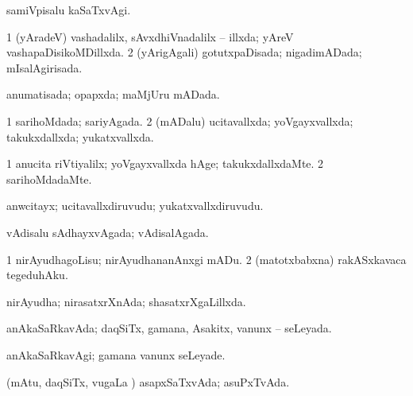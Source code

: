 {\bentry
{} 
\gl{\nA}
\expl{}
\bmng
{} 
\emng
\eentry

\bentry
{} 
\gl{\kirxvi}
\expl{}
\bmng
samiVpisalu kaSaTxvAgi. 
\emng
\eentry

\bentry
{} 
\gl{\gu}
\expl{}
\bmng
\bnum
\num{1} (yAradeV) vashadalilx, sAvxdhiVnadalilx -- illxda; yAreV vashapaDisikoMDillxda. 
\num{2} (yArigAgali) gotutxpaDisada; nigadimADada; mIsalAgirisada. 
\enum
\emng
\eentry

\bentry
{} 
\gl{\gu}
\expl{}
\bmng
anumatisada; opapxda; maMjUru mADada. 
\emng
\eentry

\bentry
{} 
\gl{\gu}
\expl{}
\bmng
\bnum
\num{1} sarihoMdada; sariyAgada. 
\num{2} (mADalu) ucitavallxda; yoVgayxvallxda; takukxdallxda; yukatxvallxda. 
\enum
\emng
\eentry

\bentry
{} 
\gl{\kirxvi}
\bmng
\bnum
\num{1} anucita riVtiyalilx; yoVgayxvallxda hAge; takukxdallxdaMte. 
\num{2} sarihoMdadaMte. 
\enum
\emng
\eentry

\bentry
{} 
\gl{\nA}
\expl{}
\bmng
anwcitayx; ucitavallxdiruvudu; yukatxvallxdiruvudu. 
\emng
\eentry

\bentry
{} 
\gl{\gu}
\expl{}
\bmng
vAdisalu sAdhayxvAgada; vAdisalAgada. 
\emng
\eentry

\bentry
{} 
\gl{\sakirx}
\expl{}
\bmng
\bnum
\num{1} nirAyudhagoLisu; nirAyudhananAnxgi mADu. 
\num{2} (matotxbabxna) rakASxkavaca tegeduhAku. 
\enum
\emng
\eentry

\bentry
{} 
\gl{\gu}
\expl{}
\bmng
nirAyudha; nirasatxrXnAda; shasatxrXgaLillxda. 
\emng
\eentry

\bentry
{} 
\gl{\gu}
\expl{}
\bmng
anAkaSaRkavAda; daqSiTx, gamana, Asakitx, \mo vanunx -- seLeyada. 
\emng
\eentry

\bentry
{} 
\gl{\kirxvi}
\expl{}
\bmng
anAkaSaRkavAgi; gamana \mo vanunx seLeyade. 
\emng
\eentry

\bentry
{} 
\gl{\gu}
\expl{}
\bmng
(mAtu, daqSiTx, \mo vugaLa \vi) asapxSaTxvAda; asuPxTvAda. 
\emng
\eentry

}
